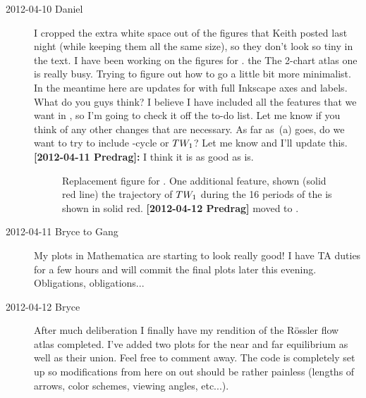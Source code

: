 \begin{description}
\item[2012-04-10 Daniel] I cropped the extra white space out of the
figures that Keith posted last night (while keeping them all the same
size), so they don't look so tiny in the text. I have been working on the
figures for \cLf. the The 2-chart atlas one is really busy. Trying to
figure out how to go a little bit more minimalist. In the meantime here
are updates for 
with full Inkscape axes and labels. What do you guys think? I believe I
have included all the features that we want in , so
I'm going to check it off the to-do list. Let me know if you think of any
other changes that are necessary. As far as \,(a)
goes, do we want to try to include -cycle or $TW_{1}$? Let
me know and I'll update this. \\
{\bf [2012-04-11 Predrag]: } I think it is as good as is.


\begin{figure}
  \caption{\label{fig:CLEWurst}
  Replacement figure for . One additional feature,
  shown (solid red line) the trajectory of $TW_{1}$ during the 16
  periods of the \rpo is shown in solid red.
  {\bf [2012-04-12 Predrag]} moved to .
  }
\end{figure}

\item[2012-04-11 Bryce to Gang] My plots in Mathematica are starting to
look really good! I have TA duties for a few hours and will commit the
final plots later this evening. Obligations, obligations...

\item[2012-04-12 Bryce] After much deliberation I finally have my
rendition of the R\"ossler flow atlas completed. I've added two plots for
the near and far equilibrium as well as their union. Feel free to comment
away. The code is completely set up so modifications from here on out
should be rather painless (lengths of arrows, color schemes, viewing
angles, etc...).


\end{description}
